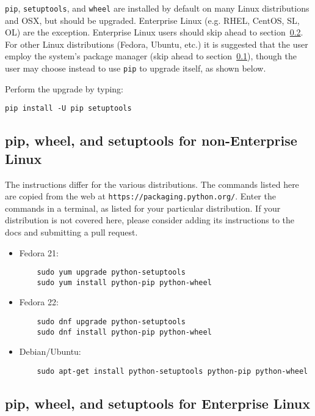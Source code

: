 \verb|pip|, \verb|setuptools|, and \verb|wheel| are installed by default 
on many Linux distributions and OSX, but should be upgraded.
Enterprise Linux (e.g. RHEL, CentOS, SL, OL) are the exception.
Enterprise Linux users should skip ahead 
to section~\ref{subsec:setup_rhel}.
For other Linux distributions (Fedora, Ubuntu, etc.)
it is suggested that the user employ the system's package manager 
(skip ahead to section~\ref{subsec:setup_non-enterprise}),
though the user may choose instead 
to use \verb|pip| to upgrade itself, as shown below.

Perform the upgrade by typing:
\begin{lstlisting}
pip install -U pip setuptools
\end{lstlisting}


\subsection{pip, wheel, and setuptools for non-Enterprise Linux}
\label{subsec:setup_non-enterprise}

The instructions differ for the various distributions.
The commands listed here are copied 
from the web at \verb|https://packaging.python.org/|.
Enter the commands in a terminal, 
as listed for your particular distribution.
If your distribution is not covered here, 
please consider adding its instructions to the docs
and submitting a pull request.

\begin{itemize}
\item Fedora 21: 
    \begin{lstlisting}
    sudo yum upgrade python-setuptools
    sudo yum install python-pip python-wheel
    \end{lstlisting}
\item Fedora 22: 
    \begin{lstlisting}
    sudo dnf upgrade python-setuptools
    sudo dnf install python-pip python-wheel
    \end{lstlisting}
\item Debian/Ubuntu: 
    \begin{lstlisting}
    sudo apt-get install python-setuptools python-pip python-wheel
    \end{lstlisting}
\end{itemize}


\subsection{pip, wheel, and setuptools for Enterprise Linux}
\label{subsec:setup_rhel}

